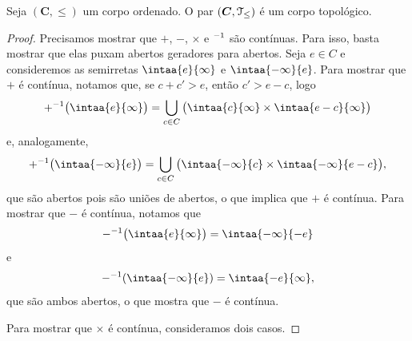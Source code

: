 \begin{prop}
Seja $(\bm C,\leq)$ um corpo ordenado. O par $(\bm C,\mathcal{T}_\leq)$ é um corpo topológico.
\end{prop}
\begin{proof}
Precisamos mostrar que $+$, $-$, $\times$ e $^{-1}$ são contínuas. Para isso, basta mostrar que elas puxam abertos geradores para abertos. Seja $e \in C$ e consideremos as semirretas $\intaa{e}{\infty}$ e $\intaa{-\infty}{e}$. Para mostrar que $+$ é contínua, notamos que, se $c+c' > e$, então $c' > e-c$, logo
	\begin{equation*}
	+\inv \big( \intaa{e}{\infty} \big) = \bigcup_{c \in C} \big( \intaa{c}{\infty} \times \intaa{e-c}{\infty} \big)
	\end{equation*}
e, analogamente,
	\begin{equation*}
	+\inv \big( \intaa{-\infty}{e} \big) = \bigcup_{c \in C} \big( \intaa{-\infty}{c} \times \intaa{-\infty}{e-c} \big),
	\end{equation*}
que são abertos pois são uniões de abertos, o que implica que $+$ é contínua. Para mostrar que $-$ é contínua, notamos que
	\begin{equation*}
	-\inv \big( \intaa{e}{\infty} \big) = \intaa{-\infty}{-e}
	\end{equation*}
e
	\begin{equation*}
	-\inv( \intaa{-\infty}{e} ) = \intaa{-e}{\infty},
	\end{equation*}
que são ambos abertos, o que mostra que $-$ é contínua.

Para mostrar que $\times$ é contínua, consideramos dois casos. 


\end{proof}
